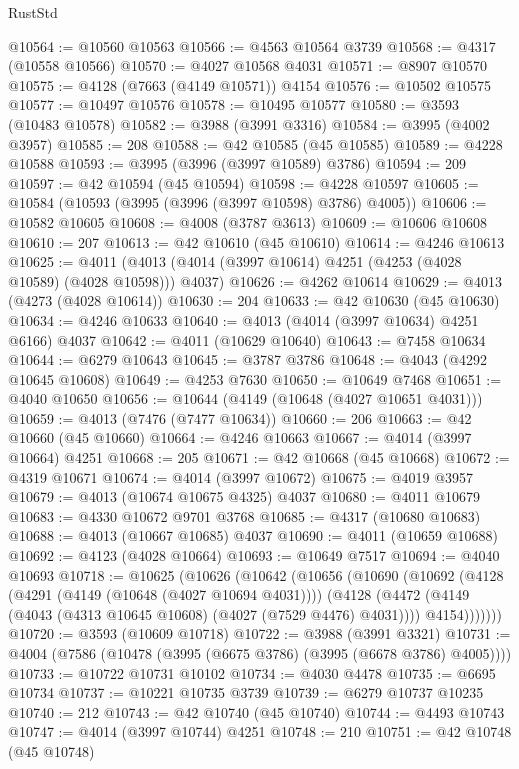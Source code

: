 \begin{lexlean}{RustStd}
\begin{coremodule}
@10564 := @10560 @10563
@10566 := @4563 @10564 @3739
@10568 := @4317 (@10558 @10566)
@10570 := @4027 @10568 @4031
@10571 := @8907 @10570
@10575 := @4128 (@7663 (@4149 @10571)) @4154
@10576 := @10502 @10575
@10577 := @10497 @10576
@10578 := @10495 @10577
@10580 := @3593 (@10483 @10578)
@10582 := @3988 (@3991 @3316)
@10584 := @3995 (@4002 @3957)
@10585 := 208
@10588 := @42 @10585 (@45 @10585)
@10589 := @4228 @10588
@10593 := @3995 (@3996 (@3997 @10589) @3786)
@10594 := 209
@10597 := @42 @10594 (@45 @10594)
@10598 := @4228 @10597
@10605 := @10584 (@10593 (@3995 (@3996 (@3997 @10598) @3786) @4005))
@10606 := @10582 @10605
@10608 := @4008 (@3787 @3613)
@10609 := @10606 @10608
@10610 := 207
@10613 := @42 @10610 (@45 @10610)
@10614 := @4246 @10613
@10625 := @4011 (@4013 (@4014 (@3997 @10614) @4251 (@4253 (@4028 @10589) (@4028 @10598))) @4037)
@10626 := @4262 @10614
@10629 := @4013 (@4273 (@4028 @10614))
@10630 := 204
@10633 := @42 @10630 (@45 @10630)
@10634 := @4246 @10633
@10640 := @4013 (@4014 (@3997 @10634) @4251 @6166) @4037
@10642 := @4011 (@10629 @10640)
@10643 := @7458 @10634
@10644 := @6279 @10643
@10645 := @3787 @3786
@10648 := @4043 (@4292 @10645 @10608)
@10649 := @4253 @7630
@10650 := @10649 @7468
@10651 := @4040 @10650
@10656 := @10644 (@4149 (@10648 (@4027 @10651 @4031)))
@10659 := @4013 (@7476 (@7477 @10634))
@10660 := 206
@10663 := @42 @10660 (@45 @10660)
@10664 := @4246 @10663
@10667 := @4014 (@3997 @10664) @4251
@10668 := 205
@10671 := @42 @10668 (@45 @10668)
@10672 := @4319 @10671
@10674 := @4014 (@3997 @10672)
@10675 := @4019 @3957
@10679 := @4013 (@10674 @10675 @4325) @4037
@10680 := @4011 @10679
@10683 := @4330 @10672 @9701 @3768
@10685 := @4317 (@10680 @10683)
@10688 := @4013 (@10667 @10685) @4037
@10690 := @4011 (@10659 @10688)
@10692 := @4123 (@4028 @10664)
@10693 := @10649 @7517
@10694 := @4040 @10693
@10718 := @10625
    (@10626
      (@10642
        (@10656
          (@10690
            (@10692
              (@4128
                (@4291 (@4149 (@10648 (@4027 @10694 @4031))))
                (@4128
                  (@4472 (@4149 (@4043 (@4313 @10645 @10608) (@4027 (@7529 @4476) @4031))))
                  @4154)))))))
@10720 := @3593 (@10609 @10718)
@10722 := @3988 (@3991 @3321)
@10731 := @4004 (@7586 (@10478 (@3995 (@6675 @3786) (@3995 (@6678 @3786) @4005))))
@10733 := @10722 @10731 @10102
@10734 := @4030 @4478
@10735 := @6695 @10734
@10737 := @10221 @10735 @3739
@10739 := @6279 @10737 @10235
@10740 := 212
@10743 := @42 @10740 (@45 @10740)
@10744 := @4493 @10743
@10747 := @4014 (@3997 @10744) @4251
@10748 := 210
@10751 := @42 @10748 (@45 @10748)

\end{coremodule}
\end{lexlean}
